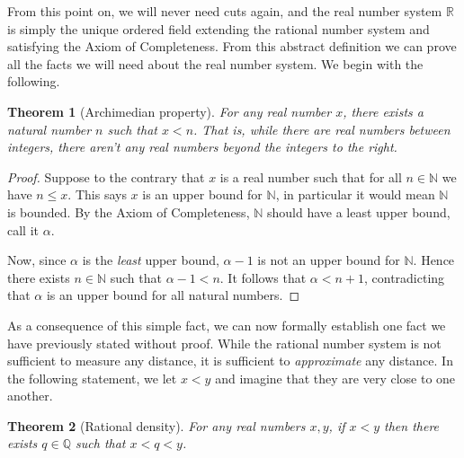 \documentclass[11pt,oneside]{amsbook}
\newcommand{\N}{\mathbb N}
\newcommand{\Q}{\mathbb Q}
\newcommand{\R}{\mathbb R}
\theoremstyle{definition}
\theoremstyle{plain}
\newtheorem{theorem}{Theorem}[section]
\theoremstyle{definition}
\theoremstyle{remark}
\numberwithin{equation}{section}
\numberwithin{figure}{section}
\begin{document}
From this point on, we will never need cuts again, and the real number system $\R$ is simply the unique ordered field extending the rational number system and satisfying the Axiom of Completeness. From this abstract definition we can prove all the facts we will need about the real number system. We begin with the following.

\begin{theorem}[Archimedian property]
  For any real number $x$, there exists a natural number $n$ such that $x<n$. That is, while there are real numbers between integers, there aren't any real numbers beyond the integers to the right.
\end{theorem}

\begin{proof}
  Suppose to the contrary that $x$ is a real number such that for all $n\in\N$ we have $n\leq x$. This says $x$ is an upper bound for $\N$, in particular it would mean $\N$ is bounded. By the Axiom of Completeness, $\N$ should have a least upper bound, call it $\alpha$.

  Now, since $\alpha$ is the \emph{least} upper bound, $\alpha-1$ is not an upper bound for $\N$. Hence there exists $n\in\N$ such that $\alpha-1<n$. It follows that $\alpha<n+1$, contradicting that $\alpha$ is an upper bound for all natural numbers.
\end{proof}

\begin{center}
\end{center}

As a consequence of this simple fact, we can now formally establish one fact we have previously stated without proof. While the rational number system is not sufficient to measure any distance, it is sufficient to \emph{approximate} any distance. In the following statement, we let $x<y$ and imagine that they are very close to one another.

\begin{theorem}[Rational density]
  For any real numbers $x,y$, if $x<y$ then there exists $q\in\Q$ such that $x<q<y$.
\end{theorem}
\end{document}
